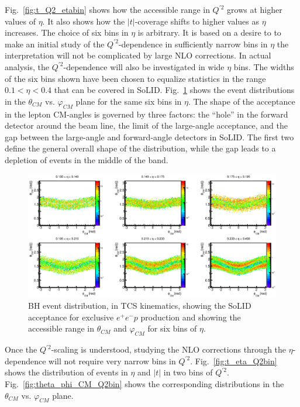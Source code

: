 Fig.~\ref{fig:t_Q2_etabin} shows how the accessible range in $Q^{\prime 2}$
grows at higher values of $\eta$. It also shows how the $|t|$-coverage
shifts to higher values as $\eta$ increases.
The choice of six bins in $\eta$ is arbitrary. It is based on a desire to
to make an initial study of the $Q^{\prime 2}$-dependence in sufficiently
narrow bins in $\eta$ the interpretation will not be complicated by 
large NLO corrections. In actual  analysis, the $Q^{\prime 2}$-dependence
will also be investigated in wide $\eta$ bins. The widths of the six bins
shown have been chosen to equalize statistics in the range $0.1<\eta<0.4$
that can be covered in SoLID.
Fig.~\ref{fig:theta_phi_CM_etabin} shows the event distributions in the
$\theta_{CM}$ vs. $\varphi_{CM}$ plane for the same six bins in $\eta$.
The shape of the acceptance in the lepton CM-angles is governed by three
factors: the ``hole'' in the forward detector around the beam line, the
limit of the large-angle acceptance, and the gap between the large-angle
and forward-angle detectors in SoLID. 
The first two define the general overall shape of the distribution, while
the gap leads to a depletion of events in the middle of the band.

\begin{figure}[t]
\includegraphics[scale=0.8]{theta_phi_CM_etabin.eps}
\caption{\small{BH event distribution, in TCS kinematics, showing the SoLID
acceptance for exclusive $e^+e^-p$ production and showing the accessible range
in $\theta_{CM}$ and $\varphi_{CM}$ for six bins of $\eta$.}}
\label{fig:theta_phi_CM_etabin}
\end{figure}

Once the $Q^{\prime 2}$-scaling is understood, studying the NLO corrections
through the $\eta$-dependence will not require very narrow bins in
$Q^{\prime 2}$. Fig.~\ref{fig:t_eta_Q2bin} shows the distribution of events
in $\eta$ and $|t|$ in two bins of $Q^{\prime 2}$.
Fig.~\ref{fig:theta_phi_CM_Q2bin} shows the corresponding distributions in
the $\theta_{CM}$ vs. $\varphi_{CM}$ plane.

